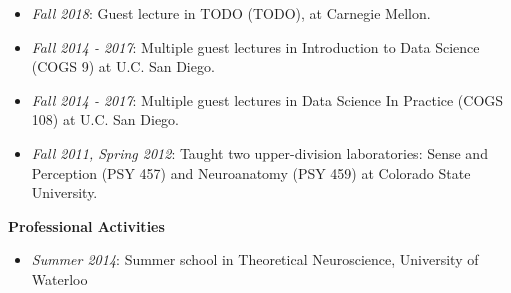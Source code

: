\begin{itemize}
\item
  \emph{Fall 2018}: Guest lecture in TODO (TODO), at Carnegie Mellon.
\item
  \emph{Fall 2014 - 2017}: Multiple guest lectures in Introduction to
  Data Science (COGS 9) at U.C. San Diego.
\item
  \emph{Fall 2014 - 2017}: Multiple guest lectures in Data Science In
  Practice (COGS 108) at U.C. San Diego.
\item
  \emph{Fall 2011, Spring 2012}: Taught two upper-division laboratories:
  Sense and Perception (PSY 457) and Neuroanatomy (PSY 459) at Colorado
  State University.
\end{itemize}

\textbf{Professional Activities}

\begin{itemize}
\tightlist
\item
  \emph{Summer 2014}: Summer school in Theoretical Neuroscience,
  University of Waterloo
\end{itemize}
